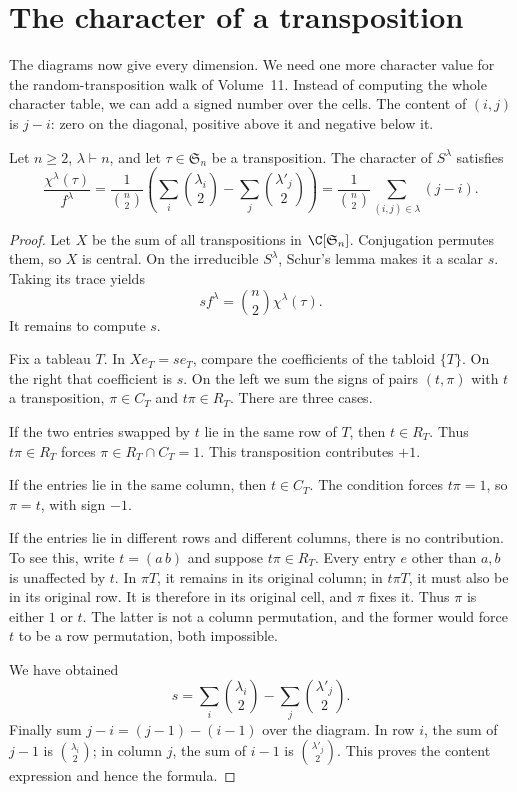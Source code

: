 \section{The character of a transposition}

The diagrams now give every dimension. We need one more character value for the random-transposition walk of Volume~11. Instead of computing the whole character table, we can add a signed number over the cells. The content of $(i,j)$ is $j-i$: zero on the diagonal, positive above it and negative below it.

\begin{theorem}[Frobenius, 1900]\label{thm:transposition}
Let $n\ge2$, $\lambda\vdash n$, and let $\tau\in\mathfrak S_n$ be a transposition. The character of $S^\lambda$ satisfies
\[
\frac{\chi^\lambda(\tau)}{f^\lambda}
=\frac1{\binom n2}
\left(\sum_i\binom{\lambda_i}2-\sum_j\binom{\lambda'_j}2\right)
=\frac1{\binom n2}\sum_{(i,j)\in\lambda}(j-i).
\]
\end{theorem}

\begin{proof}
Let $X$ be the sum of all transpositions in $\C[\mathfrak S_n]$. Conjugation permutes them, so $X$ is central. On the irreducible $S^\lambda$, Schur's lemma makes it a scalar $s$. Taking its trace yields
\[
sf^\lambda=\binom n2\chi^\lambda(\tau).
\]
It remains to compute $s$.

Fix a tableau $T$. In $Xe_T=s e_T$, compare the coefficients of the tabloid $\{T\}$. On the right that coefficient is $s$. On the left we sum the signs of pairs $(t,\pi)$ with $t$ a transposition, $\pi\in C_T$ and $t\pi\in R_T$. There are three cases.

If the two entries swapped by $t$ lie in the same row of $T$, then $t\in R_T$. Thus $t\pi\in R_T$ forces $\pi\in R_T\cap C_T=1$. This transposition contributes $+1$.

If the entries lie in the same column, then $t\in C_T$. The condition forces $t\pi=1$, so $\pi=t$, with sign $-1$.

If the entries lie in different rows and different columns, there is no contribution. To see this, write $t=(a\,b)$ and suppose $t\pi\in R_T$. Every entry $e$ other than $a,b$ is unaffected by $t$. In $\pi T$, it remains in its original column; in $t\pi T$, it must also be in its original row. It is therefore in its original cell, and $\pi$ fixes it. Thus $\pi$ is either $1$ or $t$. The latter is not a column permutation, and the former would force $t$ to be a row permutation, both impossible.

We have obtained
\[
s=\sum_i\binom{\lambda_i}2-\sum_j\binom{\lambda'_j}2.
\]
Finally sum $j-i=(j-1)-(i-1)$ over the diagram. In row $i$, the sum of $j-1$ is $\binom{\lambda_i}2$; in column $j$, the sum of $i-1$ is $\binom{\lambda'_j}2$. This proves the content expression and hence the formula.
\end{proof}

